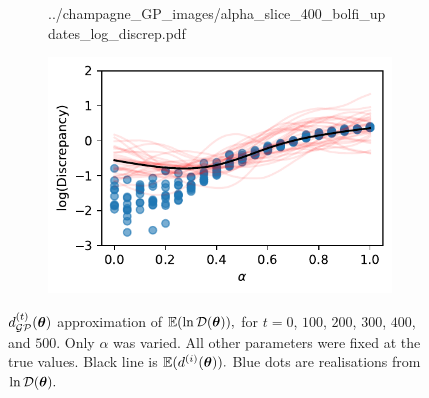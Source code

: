 \begin{figure}[htbp]
\begin{subfigure}[b]{0.5\textwidth}
{            ../champagne_GP_images/alpha_slice_400_bolfi_updates_log_discrep.pdf
        }
    \end{subfigure}%
    \hfill%
    \begin{subfigure}[b]{0.5\textwidth}
        \centering
        \includegraphics[width=\textwidth]{
            ../champagne_GP_images/alpha_slice_500_bolfi_updates_log_discrep.pdf
        }
    \end{subfigure}
    \caption{
        $d_{\mathcal{GP}}^{(t)}(\bm{\theta})$ approximation of $\operatorname{\mathbb{E}}(\ln\mathcal{D}(\bm{\theta})),$ 
        for $t= 0$, $100$, $200$, $300$, $400$, and $500.$ Only $\alpha$ was 
        varied. All other parameters were fixed at the true values. Black line 
        is
        $\operatorname{\mathbb{E}}(d^{(i)}(\bm{\theta})).$
        Blue dots are realisations from $\ln\mathcal{D}(\bm{\theta}).$
    }
\end{figure}

